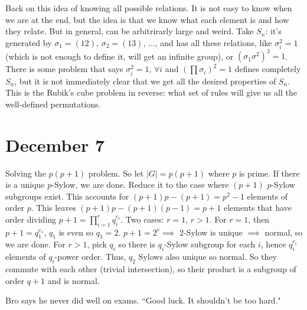 \documentclass{article}
\theoremstyle{plain}
\theoremstyle{remark}
\begin{document}
Back on this idea of knowing all possible relations.
It is not easy to know when we are at the end,
but the idea is that we know what each element is
and how they relate.
But in general, can be arbitrirarly large and weird.
Take $S_n$: it's generated by $\sigma_1 = (12)$, $\sigma_2 = (13)$, $\dots$,
and has all these relations, like $\sigma_i^2 = 1$
(which is not enough to define it, will get an infinite group),
or $(\sigma_1\sigma^2)^3 = 1$.
There is some problem that says $\sigma_i^2 = 1$, $\forall i$ and $(\prod \sigma_i)^2 = 1$
defines completely $S_n$,
but it is not immediately clear that we get all the desired properties of $S_n$.
This is the Rubik's cube problem in reverse:
what set of rules will give us all the well-defined permutations.

\section{December 7}
Solving the $p(p+1)$ problem.
So let $|G| = p(p+1)$ where $p$ is prime.
If there is a unique $p$-Sylow, we are done.
Reduce it to the case where $(p+1)$ $p$-Sylow subgroups exist.
This accounts for $(p+1)p - (p+1) = p^2 - 1$ elements of order $p$.
This leaves $(p+1)p - (p+1)(p-1) = p+1$ elements
that have order dividing $p+1 = \prod_{i=1}^r q_i^{e_i}$.
Two cases: $r = 1$, $r>1$.
For $r=1$, then $p + 1 = q_1^{e_1}$, $q_1$ is even so $q_1 = 2$.
$p+1 = 2^e \implies $ $2$-Sylow is unique $\implies$ normal, so we are done.
For $r>1$, pick $q_i$ so there is $q_i$-Sylow subgroup for each $i$,
hence $q_i^{e_i}$ elements of $q_i$-power order.
Thus, $q_2$ Sylows also unique so normal.
So they commute with each other (trivial intersection),
so their product is a subgroup of order $q+1$ and is normal.

Bro says he never did well on exams.
``Good luck. It shouldn't be too hard."
\end{document}
